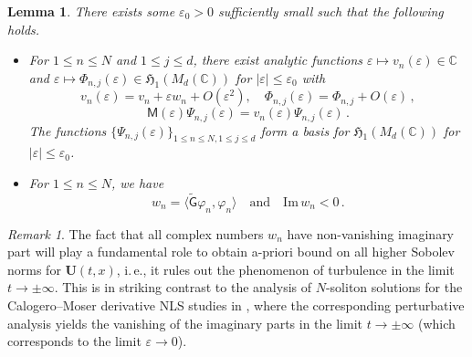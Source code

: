 \documentclass[11pt,reqno]{amsart}
\newtheorem{lem}{Lemma}[section]
\theoremstyle{definition}
\theoremstyle{remark}
\theoremstyle{remark}
\newtheorem*{remark*}{Remark}
\numberwithin{equation}{section}
\newcommand{\Hfr}{\mathfrak{H}}
\newcommand{\C}{\mathbb{C}}
\newcommand{\eps}{\varepsilon}
\newcommand{\Ms}{\mathsf{M}}
\newcommand{\Ub}{\mathbf{U}}
\newcommand{\Gs}{\mathsf{G}}
\newcommand{\Gst}{\widetilde{\Gs}}
\renewcommand{\phi}{\varphi}
\begin{document}
\begin{lem} \label{lem:M_pert}
There exists some $\eps_0 > 0$ sufficiently small such that the following  holds.
\begin{itemize}
\item[(i)] For $1 \leq n \leq N$ and $1 \leq j \leq d$, there exist analytic functions $\eps \mapsto v_n(\eps) \in \C$ and $\eps \mapsto \Phi_{n,j}(\eps) \in \Hfr_1(M_d(\C))$ for $|\eps| \leq \eps_0$ with
$$
v_n(\eps) = v_n + \eps w_n + O(\eps^2), \quad \Phi_{n,j}(\eps) = \Phi_{n,j} + O(\eps) \, ,
$$
$$
\Ms(\eps) \Psi_{n,j}(\eps)= v_n(\eps) \Psi_{n,j}(\eps) \, .
$$
The functions $\{ \Psi_{n,j}(\eps) \}_{1 \leq n \leq N, 1 \leq j \leq d}$ form a basis for $\Hfr_1(M_d(\C))$ for $|\eps| \leq \eps_0$.
\item[(ii)] For $1 \leq n \leq N$, we have 
$$
w_n = \langle \Gst \phi_n, \phi_n \rangle \quad \mbox{and} \quad \mathrm{Im} \, w_n <  0 \, .
$$
\end{itemize}
\end{lem} 

\begin{remark*}
The fact that all complex numbers $w_n$ have non-vanishing imaginary part will play a fundamental role to obtain a-priori bound on all higher Sobolev norms for $\Ub(t,x)$, i.\,e., it rules out the phenomenon of turbulence in the limit $t \to \pm \infty$. This is in striking contrast to the analysis of $N$-soliton solutions for the Calogero--Moser derivative NLS studies in \cite{GeLe-24}, where the corresponding perturbative analysis yields the vanishing of the imaginary parts in the limit $t \to \pm \infty$ (which corresponds to the limit $\eps \to 0$).  
\end{remark*}
\end{document}

